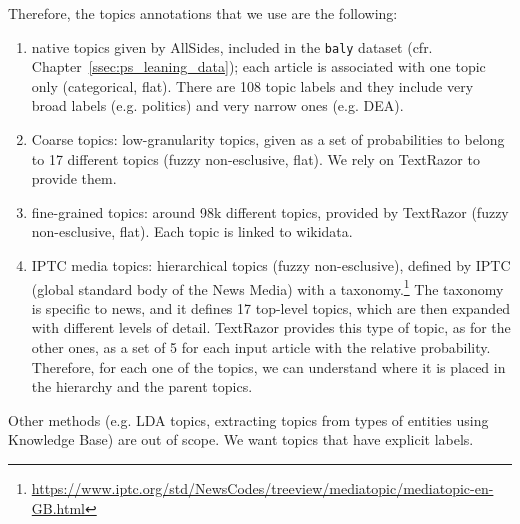 Therefore, the topics annotations that we use are the following:

\begin{enumerate}
    \item native topics given by AllSides, included in the \texttt{baly} dataset (cfr. Chapter~\ref{ssec:ps_leaning_data}); each article is associated with one topic only (categorical, flat). There are 108 topic labels and they include very broad labels (e.g. politics) and very narrow ones (e.g. DEA).
    \item Coarse topics: low-granularity topics, given as a set of probabilities to belong to 17 different topics (fuzzy non-esclusive, flat). We rely on TextRazor to provide them.
    \item fine-grained topics: around 98k different topics, provided by TextRazor (fuzzy non-esclusive, flat). Each topic is linked to wikidata.
    \item IPTC media topics: hierarchical topics (fuzzy non-esclusive),
    defined by IPTC (global standard body of the News Media) with a taxonomy.\footnote{\url{https://www.iptc.org/std/NewsCodes/treeview/mediatopic/mediatopic-en-GB.html}}
    The taxonomy is specific to news, and it defines 17 top-level topics, which are then expanded with different levels of detail. TextRazor provides this type of topic, as for the other ones, as a set of 5 for each input article with the relative probability.
    Therefore, for each one of the topics, we can understand where it is placed in the hierarchy and the parent topics.
\end{enumerate}



Other methods (e.g. LDA topics, extracting topics from types of entities using Knowledge Base) are out of scope. We want topics that have explicit labels.%

